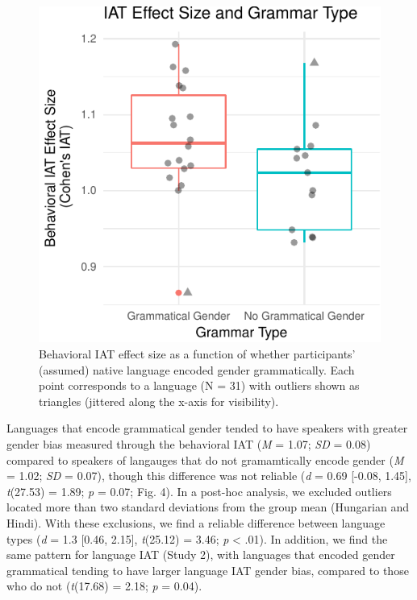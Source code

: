 \documentclass[10pt, letterpaper]{article}
\newenvironment{CodeChunk}{}{}
\begin{document}
\begin{CodeChunk}
\begin{figure}[t]

{\centering \includegraphics{figs/grammatical_gender_plot-1} 

}

\caption[Behavioral IAT effect size as a function of whether participants' (assumed) native language encoded gender grammatically]{Behavioral IAT effect size as a function of whether participants' (assumed) native language encoded gender grammatically. Each point corresponds to a language (N = 31) with outliers shown as triangles (jittered along the x-axis for visibility).}\label{fig:grammatical_gender_plot}
\end{figure}
\end{CodeChunk}

Languages that encode grammatical gender tended to have speakers with
greater gender bias measured through the behavioral IAT (\emph{M} =
1.07; \emph{SD} = 0.08) compared to speakers of langauges that do not
gramamtically encode gender (\emph{M} = 1.02; \emph{SD} = 0.07), though
this difference was not reliable (\emph{d} = 0.69 {[}-0.08, 1.45{]},
\emph{t}(27.53) = 1.89; \emph{p} = 0.07; Fig. 4). In a post-hoc
analysis, we excluded outliers located more than two standard deviations
from the group mean (Hungarian and Hindi). With these exclusions, we
find a reliable difference between language types (\emph{d} = 1.3
{[}0.46, 2.15{]}, \emph{t}(25.12) = 3.46; \emph{p} \textless{} .01). In
addition, we find the same pattern for language IAT (Study 2), with
languages that encoded gender grammatical tending to have larger
language IAT gender bias, compared to those who do not (\emph{t}(17.68)
= 2.18; \emph{p} = 0.04).
\end{document}
